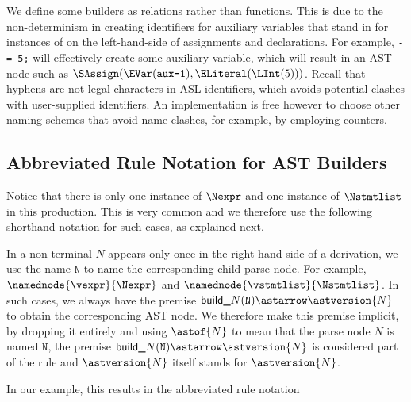 We define some builders as relations rather than functions. This is due to the non-determinism
in creating identifiers for auxiliary variables that stand in for instances of \discardvar{} on the left-hand-side
of assignments and declarations.
For example, \texttt{- = 5;} will effectively create some auxiliary variable, which will result in
an AST node such as $\SAssign(\EVar(\texttt{aux-1}), \ELiteral(\LInt(5)))$.
Recall that hyphens are not legal characters in ASL identifiers, which avoids potential clashes with
user-supplied identifiers. An implementation is free however to choose other naming schemes that
avoid name clashes, for example, by employing counters.

\subsection{Abbreviated Rule Notation for AST Builders}
Notice that there is only one instance of $\Nexpr$ and one instance of $\Nstmtlist$ in this production.
This is very common and we therefore use the following shorthand notation for such cases, as explained next.

In a non-terminal $N$ appears only once in the right-hand-side of a derivation,
we use the name $\texttt{N}$ to name the corresponding child parse node.
For example, $\namednode{\vexpr}{\Nexpr}$ and $\namednode{\vstmtlist}{\Nstmtlist}$.
In such cases, we always have the premise $\textsf{build\_}N(\texttt{N}) \astarrow \astversion{N}$
to obtain the corresponding AST node.
We therefore make this premise implicit, by dropping it entirely and using $\astof{N}$ to mean that
the parse node $N$ is named $\texttt{N}$, the premise $\textsf{build\_}N(\texttt{N}) \astarrow \astversion{N}$
is considered part of the rule and $\astversion{N}$ itself stands for $\astversion{N}$.

In our example, this results in the abbreviated rule notation
\begin{mathpar}
\end{mathpar}

